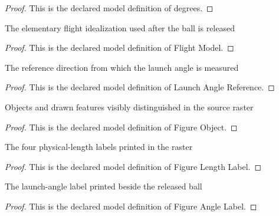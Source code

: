 \begin{proof}
  This is the declared model definition of degrees.
\end{proof}
\begin{definition}
  \label{def:physics:phyx-mini-0751:phyxminiproblems-problemphyxmini0751-flightmodel}
  The elementary flight idealization used after the ball is released
\end{definition}
\begin{proof}
  This is the declared model definition of Flight Model.
\end{proof}
\begin{definition}
  \label{def:physics:phyx-mini-0751:phyxminiproblems-problemphyxmini0751-launchanglereference}
  The reference direction from which the launch angle is measured
\end{definition}
\begin{proof}
  This is the declared model definition of Launch Angle Reference.
\end{proof}
\begin{definition}
  \label{def:physics:phyx-mini-0751:phyxminiproblems-problemphyxmini0751-figureobject}
  Objects and drawn features visibly distinguished in the source raster
\end{definition}
\begin{proof}
  This is the declared model definition of Figure Object.
\end{proof}
\begin{definition}
  \label{def:physics:phyx-mini-0751:phyxminiproblems-problemphyxmini0751-figurelengthlabel}
  The four physical-length labels printed in the raster
\end{definition}
\begin{proof}
  This is the declared model definition of Figure Length Label.
\end{proof}
\begin{definition}
  \label{def:physics:phyx-mini-0751:phyxminiproblems-problemphyxmini0751-figureanglelabel}
  The launch-angle label printed beside the released ball
\end{definition}
\begin{proof}
  This is the declared model definition of Figure Angle Label.
\end{proof}
